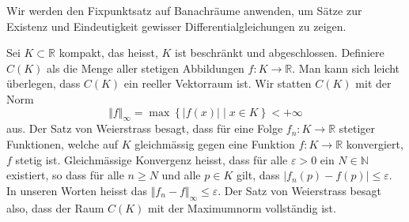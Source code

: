 \documentclass[../main.tex]{subfiles}
\begin{document}
Wir werden den Fixpunktsatz auf Banachräume
anwenden, um Sätze zur Existenz und Eindeutigkeit
gewisser Differentialgleichungen zu zeigen.

\begin{example}
  Sei $K \subset \mathbb{R}$ kompakt,
  das heisst, $K$ ist beschränkt und abgeschlossen.
  Definiere $C(K)$ als die Menge aller stetigen
  Abbildungen  $f \colon K \to \mathbb{R}$.
  Man kann sich leicht überlegen,
  dass $C(K)$ ein reeller Vektorraum ist.
  Wir statten $C(K)$ mit der Norm
  \[
    \Vert f \Vert_{\infty} =
    \max \left\{|f(x)| \mid x \in K\right\} < +\infty
  \]
  aus. Der Satz von Weierstrass besagt,
  dass für eine Folge $f_n \colon K \to \mathbb{R}$
  stetiger Funktionen, welche auf $K$
  gleichmässig gegen eine Funktion $f \colon K \to \mathbb{R}$
  konvergiert, $f$ stetig ist.
  Gleichmässige Konvergenz heisst,
  dass für alle $\varepsilon > 0$
  ein $N \in \mathbb{N}$ existiert, so dass
  für alle $n \geq N$ und alle $p \in K$ gilt,
  dass $|f_n(p) - f(p)| \leq \varepsilon$.
  In unseren Worten heisst das
  $\Vert f_n - f \Vert_{\infty} \leq \varepsilon$.
  Der Satz von Weierstrass besagt also,
  dass der Raum $C(K)$ mit der Maximumnorm vollständig ist.
\end{example}
\end{document}
